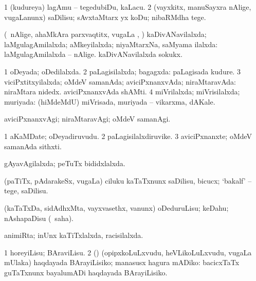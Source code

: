 \bentry
{} 
\gl{\sakirx}
\expl{}
\bmng
\bnum
\num{1} (kudureya) lagAmu -- tegedubiDu, kaLacu. 
\num{2} (vayxkitx, manuSayxra nAlige, \mo vugaLanunx) saDilisu; sAvxtaMtarx yx koDu; nibaRMdha tege. 
\enum
\emng
\eentry

\bentry
{} 
\gl{\gu}
\expl{}
\bmng
(\kanmu\ nAlige, ahaMkAra parxvaqtitx, \mo vugaLa \vi, \rUpa) kaDivANavilalxda; laMgulagAmilalxda; aMkeyilalxda; niyaMtarxNa, saMyama ilalxda:  laMgulagAmilalxda -- nAlige.  kaDivANavilalxda sokukx. 
\emng
\eentry

\bentry
{} 
\gl{\gu}
\expl{}
\bmng
\bnum
\num{1} oDeyada; oDedilalxda. 
\num{2} paLagisilalxda; bagagxda:  paLagisada kudure. 
\num{3} viciPxtitxyilalxda; oMdeV samanAda; aviciPxnanxvAda; niraMtaravAda:  niraMtara nidedx.  aviciPxnanxvAda shAMti. 
\num{4} miVrilalxda; miVrisilalxda; muriyada:  (hiMdeMdU) miVrisada, muriyada -- vikarxma, dAKale. 
\enum
\emng
\eentry

\bentry
{} 
\gl{\kirxvi}
\expl{}
\bmng
aviciPxnanxvAgi; niraMtaravAgi; oMdeV samanAgi. 
\emng
\eentry

\bentry
{} 
\gl{\nA}
\expl{}
\bmng
\bnum
\num{1} aKaMDate; oDeyadiruvudu. 
\num{2} paLagisilalxdiruvike. 
\num{3} aviciPxnanxte; oMdeV samanAda sithxti. 
\enum
\emng
\eentry

\bentry
{} 
\gl{\gu}
\expl{}
\bmng
gAyavAgilalxda; peTuTx bididxlalxda. 
\emng
\eentry

\bentry
{} 
\gl{\sakirx}
\expl{}
\bmng
(paTiTx, pAdarakeSx, \mo vugaLa) ciluku kaTaTxnunx saDilisu, bicucx; `bakalf' -- tege, saDilisu. 
\emng
\eentry

\bentry
{} 
\gl{\sakirx}
\bmng
(kaTaTxDa, sidAdhxMta, vayxvasethx, \mo vanunx) oDeduruLisu; keDahu; nAshapaDisu (\rUpa\ saha). 
\emng
\eentry

\bentry
{} 
\gl{\gu}
\bmng
animiRta; inUnx kaTiTxlalxda, racisilalxda. 
\emng
\eentry

\bentry
{} 
\gl{\sakirx}
\expl{}
\bmng
\bnum
\num{1} horeyiLisu; BAraviLisu. 
\num{2} (\AtAmx) (opipxkoLuLxvudu, heVLikoLuLxvudu, \mo vugaLa mUlaka) haqdayada BArayiLisiko; manasusx hagura mADiko:  bacicxTaTx guTaTxnunx bayalumADi haqdayada BArayiLisiko. 
\enum
\emng
\eentry

